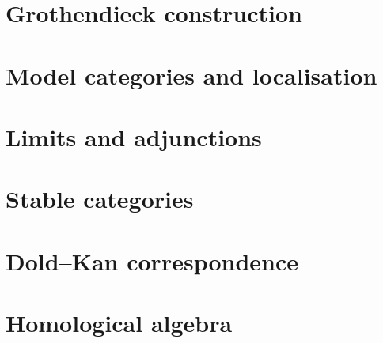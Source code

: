\documentclass[twoside]{article}
\begin{document}
\section{Grothendieck construction}



\section{Model categories and localisation}



\section{Limits and adjunctions}



\section{Stable categories}



\section{Dold--Kan correspondence}



\section{Homological algebra}



\printbibliography
\end{document}
